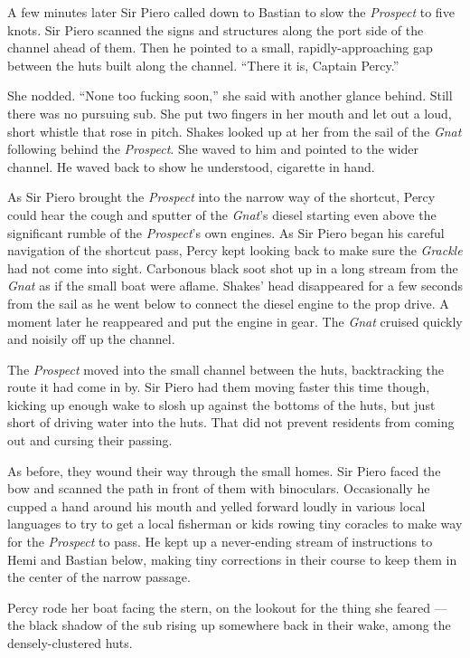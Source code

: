 \documentclass[
]{scrbook}
\begin{document}
A few minutes later Sir Piero called down to Bastian to slow the
\emph{Prospect} to five knots. Sir Piero scanned the signs and
structures along the port side of the channel ahead of them. Then he
pointed to a small, rapidly-approaching gap between the huts built along
the channel. ``There it is, Captain Percy.''

She nodded. ``None too fucking soon,'' she said with another glance
behind. Still there was no pursuing sub. She put two fingers in her
mouth and let out a loud, short whistle that rose in pitch. Shakes
looked up at her from the sail of the \emph{Gnat} following behind the
\emph{Prospect}. She waved to him and pointed to the wider channel. He
waved back to show he understood, cigarette in hand.

As Sir Piero brought the \emph{Prospect} into the narrow way of the
shortcut, Percy could hear the cough and sputter of the \emph{Gnat}'s
diesel starting even above the significant rumble of the
\emph{Prospect}'s own engines. As Sir Piero began his careful navigation
of the shortcut pass, Percy kept looking back to make sure the
\emph{Grackle} had not come into sight. Carbonous black soot shot up in
a long stream from the \emph{Gnat} as if the small boat were aflame.
Shakes' head disappeared for a few seconds from the sail as he went
below to connect the diesel engine to the prop drive. A moment later he
reappeared and put the engine in gear. The \emph{Gnat} cruised quickly
and noisily off up the channel.

The \emph{Prospect} moved into the small channel between the huts,
backtracking the route it had come in by. Sir Piero had them moving
faster this time though, kicking up enough wake to slosh up against the
bottoms of the huts, but just short of driving water into the huts. That
did not prevent residents from coming out and cursing their passing.

As before, they wound their way through the small homes. Sir Piero faced
the bow and scanned the path in front of them with binoculars.
Occasionally he cupped a hand around his mouth and yelled forward loudly
in various local languages to try to get a local fisherman or kids
rowing tiny coracles to make way for the \emph{Prospect} to pass. He
kept up a never-ending stream of instructions to Hemi and Bastian below,
making tiny corrections in their course to keep them in the center of
the narrow passage.

Percy rode her boat facing the stern, on the lookout for the thing she
feared --- the black shadow of the sub rising up somewhere back in their
wake, among the densely-clustered huts.
\end{document}
